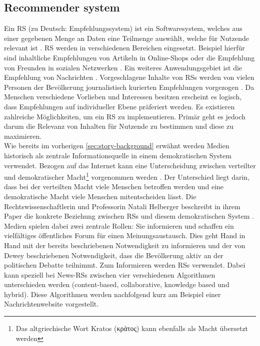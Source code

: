 \subsection{Recommender system}
Ein \acf{RS} (zu Deutsch: Empfehlungssystem) ist ein Softwaresystem, welches aus einer gegebenen Menge an Daten eine Teilmenge auswählt, welche für Nutzende relevant ist \cite{recommender-systems}.
\ac{RS} werden in verschiedenen Bereichen eingesetzt.
Beispiel hierfür sind inhaltliche Empfehlungen von Artikeln in Online-Shops oder die Empfehlung von Freunden in sozialen Netzwerken \cite{ecommerce-recommender, social-recommender}.
Ein weiteres Anwendungsgebiet ist die Empfehlung von Nachrichten \cite{news-recommender}.
Vorgeschlagene Inhalte von \acp{RS} werden von vielen Personen der Bevölkerung journalistisch kurierten Empfehlungen vorgezogen \cite{recommender-preference, theory-of-machine}.
Da Menschen verschiedene Vorlieben und Interessen besitzen erscheint es logisch, dass Empfehlungen auf individueller Ebene präferiert werden.
Es existieren zahlreiche Möglichkeiten, um ein \ac{RS} zu implementieren.
Primär geht es jedoch darum die Relevanz von Inhalten für Nutzende zu bestimmen und diese zu maximieren. \\

Wie bereits im vorherigen \autoref{sec:story-background} erwähnt werden Medien historisch als zentrale Informationsquelle in einem demokratischen System verwendet.
Bezogen auf das Internet kann eine Unterscheidung zwischen verteilter und demokratischer Macht\footnote{Das altgriechische Wort Kratos (\textgreek{κράτος}) kann ebenfalls als Macht übersetzt werden} vorgenommen werden \cite{free-speech-algorithmic}.
Der Unterschied liegt darin, dass bei der verteilten Macht viele Menschen betroffen werden und eine demokratische Macht viele Menschen mitentscheiden lässt.
Die Rechtswissenschaftlerin und Professorin Natali Helberger beschreibt in ihrem Paper die konkrete Beziehung zwischen \acp{RS} und diesem demokratischen System \cite{democratic-role}.
Medien spielen dabei zwei zentrale Rollen: Sie informieren und schaffen ein vielfältiges öffentliches Forum für einen Meinungsaustausch.
Dies geht Hand in Hand mit der bereits beschriebenen Notwendigkeit zu informieren und der von Dewey beschriebenen Notwendigkeit, dass die Bevölkerung aktiv an der politischen Debatte teilnimmt.
Zum Informieren werden \acp{RS} verwendet.
Dabei kann speziell bei News-\acp{RS} zwischen vier verschiedenen Algorithmen unterschieden werden (content-based, collaborative, knowledge based und hybrid).
Diese Algorithmen werden nachfolgend kurz am Beispiel einer Nachrichtenwebsite vorgestellt.\\

